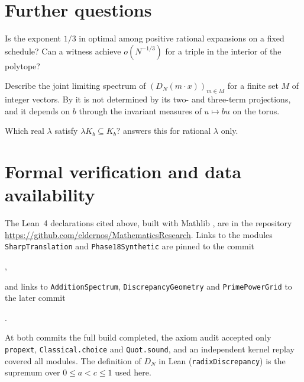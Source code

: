 \documentclass[11pt]{article}
\newcommand{\ttt}[1]{\texttt{#1}}
\begin{document}
\section{Further questions}\label{sec:questions}

\begin{question}
Is the exponent $1/3$ in  optimal among positive rational
expansions on a fixed schedule? Can a witness achieve $o(N^{-1/3})$ for a triple in the interior of the
polytope?
\end{question}

\begin{question}
Describe the joint limiting spectrum of $(D_N(m\cdot x))_{m\in M}$ for a finite set $M$ of integer
vectors. By  it is not determined by its two- and three-term projections, and it
depends on $b$ through the invariant measures of $u\mapsto bu$ on the torus.
\end{question}

\begin{question}
Which real $\lambda$ satisfy $\lambda K_b\subseteq K_b$?  answers this for rational
$\lambda$ only.
\end{question}

\section{Formal verification and data availability}\label{sec:formal}

The Lean~4 \cite{Lean4} declarations cited above, built with Mathlib \cite{Mathlib}, are in the
repository \url{https://github.com/eldernos/MathematicsResearch}. Links to the modules
\ttt{SharpTranslation} and \ttt{Phase18Synthetic} are pinned to the commit
\begin{center}\ttt{\leancommit},\end{center}
and links to \ttt{AdditionSpectrum}, \ttt{DiscrepancyGeometry} and \ttt{PrimePowerGrid} to the later
commit
\begin{center}\ttt{\phaseXIXcommit}.\end{center}
At both commits the full build completed, the axiom audit accepted only \ttt{propext},
\ttt{Classical.choice} and \ttt{Quot.sound}, and an independent kernel replay covered all modules. The
definition of $D_N$ in Lean (\ttt{radixDiscrepancy}) is the supremum over $0\le a<c\le1$ used here.
\end{document}
